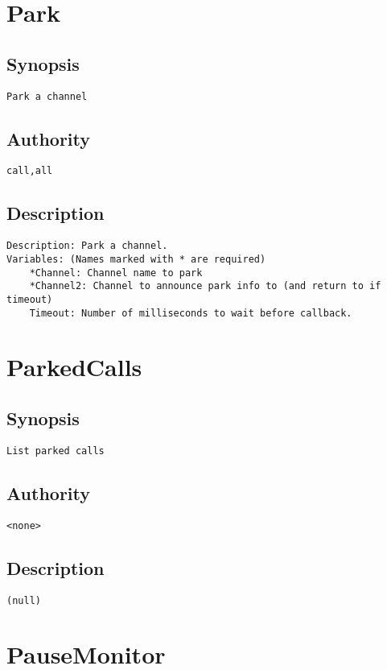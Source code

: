 \section{Park}
\subsection{Synopsis}
\begin{verbatim}
Park a channel
\end{verbatim}
\subsection{Authority}
\begin{verbatim}
call,all
\end{verbatim}
\subsection{Description}
\begin{verbatim}
Description: Park a channel.
Variables: (Names marked with * are required)
	*Channel: Channel name to park
	*Channel2: Channel to announce park info to (and return to if timeout)
	Timeout: Number of milliseconds to wait before callback.

\end{verbatim}


\section{ParkedCalls}
\subsection{Synopsis}
\begin{verbatim}
List parked calls
\end{verbatim}
\subsection{Authority}
\begin{verbatim}
<none>
\end{verbatim}
\subsection{Description}
\begin{verbatim}
(null)
\end{verbatim}


\section{PauseMonitor}
